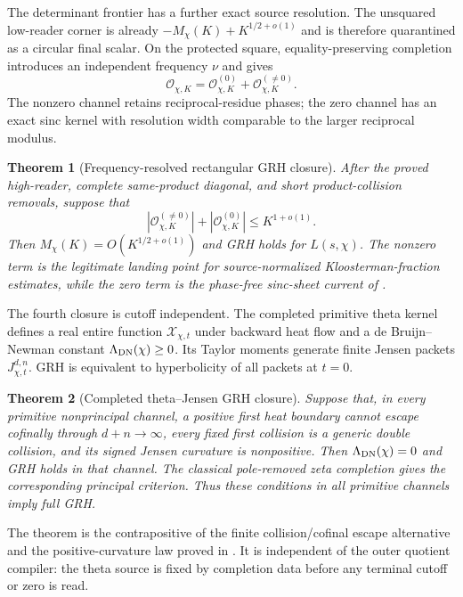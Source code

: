 \documentclass[11pt]{article}
\newtheorem{theorem}{Theorem}[section]
\theoremstyle{definition}
\theoremstyle{remark}
\begin{document}
The determinant frontier has a further exact source resolution.  The
unsquared low-reader corner is already
$-M_\chi(K)+K^{1/2+o(1)}$ and is therefore quarantined as a circular final
scalar.  On the protected square, equality-preserving completion introduces
an independent frequency $\nu$ and gives
\[
 \mathcal O_{\chi,K}
 =\mathcal O_{\chi,K}^{(0)}
  +\mathcal O_{\chi,K}^{(\ne0)}.
\]
The nonzero channel retains reciprocal-residue phases; the zero channel has
an exact sinc kernel with resolution width comparable to the larger reciprocal
modulus.

\begin{theorem}[Frequency-resolved rectangular GRH closure]
\label{thm:intro-frequency-GRH}
After the proved high-reader, complete same-product diagonal, and short
product-collision removals, suppose that
\[
 |\mathcal O_{\chi,K}^{(\ne0)}|
 +|\mathcal O_{\chi,K}^{(0)}|
 \le K^{1+o(1)}.
\]
Then $M_\chi(K)=O(K^{1/2+o(1)})$ and GRH holds for $L(s,\chi)$.  The
nonzero term is the legitimate landing point for source-normalized
Kloosterman-fraction estimates, while the zero term is the phase-free
sinc-sheet current of .
\end{theorem}

The fourth closure is cutoff independent.  The completed primitive theta
kernel defines a real entire function $\mathscr X_{\chi,t}$ under backward
heat flow and a de Bruijn--Newman constant $\Lambda_{\rm DN}(\chi)\ge0$.
Its Taylor moments generate finite Jensen packets
$J_{\chi,t}^{d,n}$.  GRH is equivalent to hyperbolicity of all packets at
$t=0$.

\begin{theorem}[Completed theta--Jensen GRH closure]
\label{thm:intro-theta-GRH}
Suppose that, in every primitive nonprincipal channel, a positive first heat
boundary cannot escape cofinally through $d+n\to\infty$, every fixed first
collision is a generic double collision, and its signed Jensen curvature is
nonpositive.  Then $\Lambda_{\rm DN}(\chi)=0$ and GRH holds in that channel.
The classical pole-removed zeta completion gives the corresponding principal
criterion.  Thus these conditions in all primitive channels imply full GRH.
\end{theorem}

The theorem is the contrapositive of the finite collision/cofinal escape
alternative and the positive-curvature law proved in
.  It is independent of the outer quotient compiler:
the theta source is fixed by completion data before any terminal cutoff or
zero is read.
\end{document}
